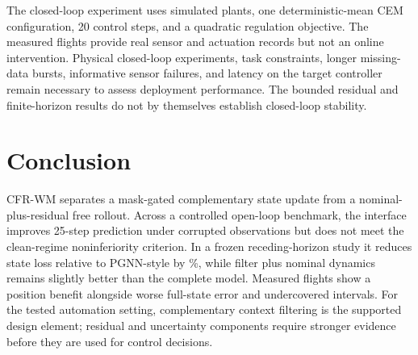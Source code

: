 The closed-loop experiment uses simulated plants, one deterministic-mean CEM
configuration, 20 control steps, and a quadratic regulation objective. The
measured flights provide real sensor and actuation records but not an online
intervention. Physical closed-loop experiments, task constraints, longer
missing-data bursts, informative sensor failures, and latency on the target
controller remain necessary to assess deployment performance. The bounded
residual and finite-horizon results do not by themselves establish closed-loop
stability.

\section{Conclusion}

CFR-WM separates a mask-gated complementary state update from a
nominal-plus-residual free rollout. Across a controlled open-loop benchmark,
the interface improves 25-step prediction under corrupted observations but
does not meet the clean-regime noninferiority criterion. In a frozen
receding-horizon study it reduces state loss relative to PGNN-style by
\ClosedLoopImprovement\%, while filter plus nominal dynamics remains slightly
better than the complete model. Measured flights show a position benefit
alongside worse full-state error and undercovered intervals. For the tested
automation setting, complementary context filtering is the supported design
element; residual and uncertainty components require stronger evidence before
they are used for control decisions.
